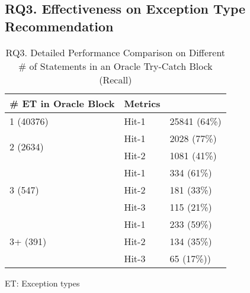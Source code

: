 \subsection{RQ3. Effectiveness on Exception Type Recommendation}
\label{sec:rq3}


\begin{table}[t]
	\caption{RQ3. Detailed Performance Comparison on Different \# of Statements in an Oracle Try-Catch Block (Recall)}
	\tabcolsep 2pt
	{\small
		\begin{center}
			\renewcommand{\arraystretch}{1}
			\begin{tabular}{p{3cm}<{\centering}|p{2cm}<{\centering}|p{2cm}<{\centering}}
				\hline
				\# ET in Oracle Block& Metrics& {\textsc{\tool}\xspace} \\
				\hline
				\multirow{1}{*}{1 (40376)}   & Hit-1  & 25841 (64\%) \\
				\hline
				\multirow{2}{*}{2 (2634)}  & Hit-1   & 2028 (77\%) \\
				& Hit-2         &  1081 (41\%) \\
				\hline
				\multirow{3}{*}{3 (547)}  & Hit-1    & 334 (61\%) \\
				& Hit-2     & 181 (33\%)\\
				& Hit-3     & 115 (21\%) \\
				\hline
				\multirow{4}{*}{3+ (391)}  & Hit-1   & 233 (59\%) \\
				& Hit-2     & 134 (35\%) \\
				& Hit-3     & 65 (17\%))\\
				\hline
			\end{tabular}		
		ET: Exception types
			\label{RQ3_results_1}
		\end{center}
	}
\end{table}

{\color{red}{1. Our model do well on hit-1 condition which means in most cases, our model can at least predict one exception type correctly for a try-catch block. 2. Results show that the more exception types one try-catch block has, our model is harder to predict all of them correctly. }}


